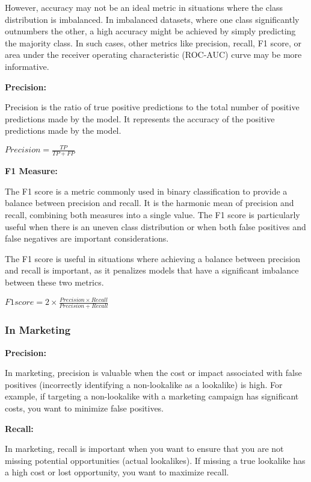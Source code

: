 \documentclass[
]{book}
\begin{document}
However, accuracy may not be an ideal metric in situations where the class distribution is imbalanced. In imbalanced datasets, where one class significantly outnumbers the other, a high accuracy might be achieved by simply predicting the majority class. In such cases, other metrics like precision, recall, F1 score, or area under the receiver operating characteristic (ROC-AUC) curve may be more informative.

\textbf{Precision:}

Precision is the ratio of true positive predictions to the total number of positive predictions made by the model. It represents the accuracy of the positive predictions made by the model.

\(Precision = \frac{TP}{TP + FP}\)

\textbf{F1 Measure:}

The F1 score is a metric commonly used in binary classification to provide a balance between precision and recall. It is the harmonic mean of precision and recall, combining both measures into a single value. The F1 score is particularly useful when there is an uneven class distribution or when both false positives and false negatives are important considerations.

The F1 score is useful in situations where achieving a balance between precision and recall is important, as it penalizes models that have a significant imbalance between these two metrics.

\(F1 score = 2 \times \frac{Precision \times Recall}{Precision + Recall}\)

\hypertarget{in-marketing}{%
\subsubsection{In Marketing}\label{in-marketing}}

\textbf{Precision:}

In marketing, precision is valuable when the cost or impact associated with false positives (incorrectly identifying a non-lookalike as a lookalike) is high. For example, if targeting a non-lookalike with a marketing campaign has significant costs, you want to minimize false positives.

\textbf{Recall:}

In marketing, recall is important when you want to ensure that you are not missing potential opportunities (actual lookalikes). If missing a true lookalike has a high cost or lost opportunity, you want to maximize recall.
\end{document}
